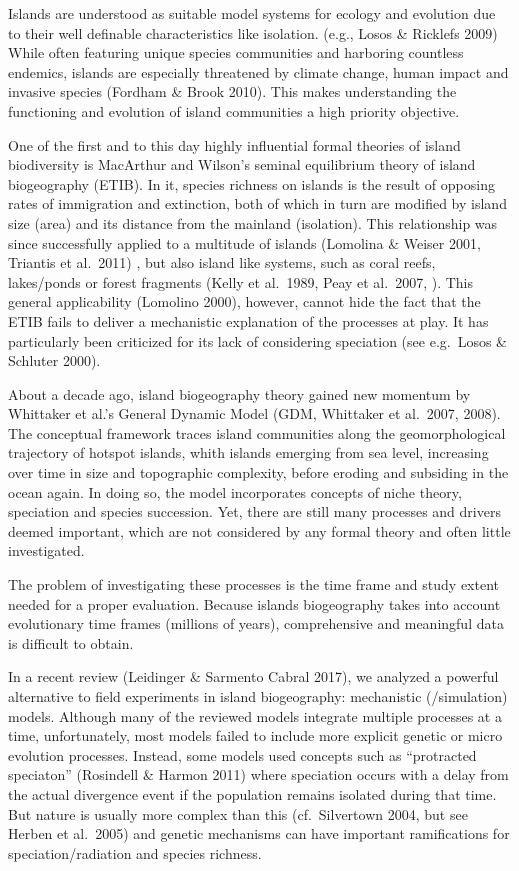 \documentclass[a4paper]{scrartcl}
\begin{document}
Islands are understood as suitable model systems for ecology and evolution due to their well definable characteristics like isolation. (e.g., Losos \& Ricklefs 2009) %
While often featuring unique species communities and harboring countless endemics, %
islands are especially threatened by climate change, human impact and invasive species (Fordham \& Brook 2010). %
This makes understanding the functioning and evolution of island communities a high priority objective.

One of the first and to this day highly influential formal theories of island biodiversity is MacArthur and Wilson's seminal equilibrium theory of island biogeography (ETIB). %
In it, species richness on islands is the result of opposing rates of immigration and extinction, both of which in turn are modified by island size (area) and its distance from the mainland (isolation).
This relationship was since successfully applied to a multitude of islands (Lomolina \& Weiser 2001, Triantis et al.\ 2011)%
, but also island like systems, such as coral reefs, lakes/ponds or forest fragments (Kelly et al.\ 1989, Peay et al.\ 2007, ). %
This general applicability (Lomolino 2000), however, cannot hide the fact that the ETIB fails to deliver a mechanistic explanation of the processes at play.
It has particularly been criticized for its lack of considering speciation (see e.g.\ Losos \& Schluter 2000). %

About a decade ago, island biogeography theory gained new momentum by Whittaker et al.'s General Dynamic Model (GDM, Whittaker et al.\ 2007, 2008). %
The conceptual framework traces island communities along the geomorphological trajectory of hotspot islands,
whith islands emerging from sea level, increasing over time in size and topographic complexity, before eroding and subsiding in the ocean again.
In doing so, the model incorporates concepts of niche theory, speciation and species succession.
Yet, there are still many processes and drivers deemed important, which are not considered by any formal theory and often little investigated.

The problem of investigating these processes is the time frame and study extent needed for a proper evaluation.
Because islands biogeography takes into account evolutionary time frames (millions of years),
comprehensive and meaningful data is difficult to obtain.

In a recent review %
(Leidinger \& Sarmento Cabral 2017), we analyzed a powerful alternative to field experiments in island biogeography: mechanistic (/simulation) models.
Although many of the reviewed models integrate multiple processes at a time, unfortunately, most models failed to include more explicit genetic or micro evolution processes.
Instead, some models used concepts such as ``protracted speciaton'' (Rosindell \& Harmon 2011) %
where speciation occurs with a delay from the actual
divergence event if the population remains isolated during that time.
But nature is usually more complex than this (cf.\ Silvertown 2004, but see Herben et al.\ 2005) and genetic mechanisms can have important ramifications for speciation/radiation and species richness.
\end{document}
